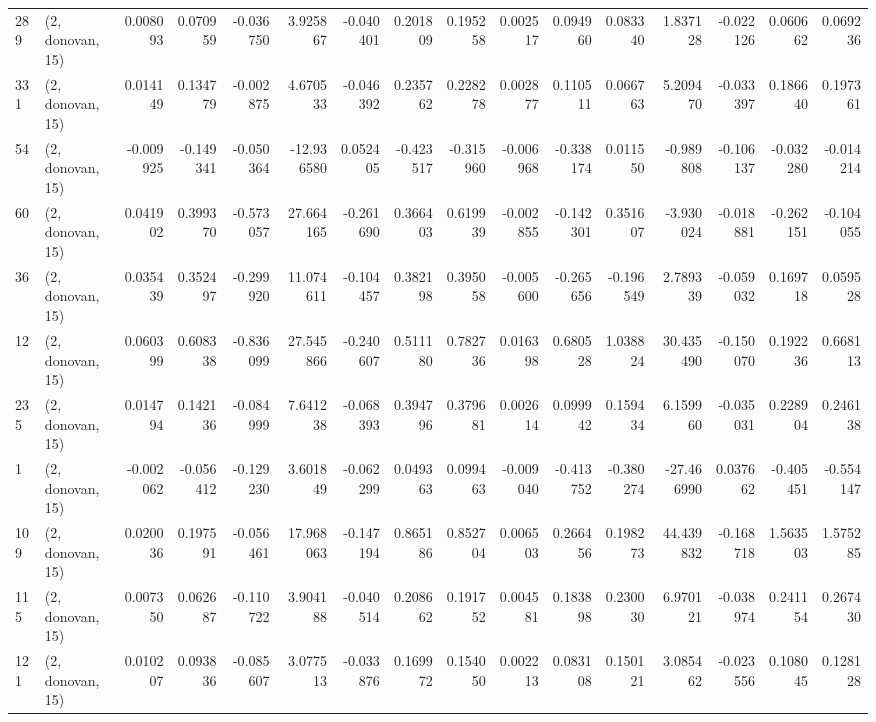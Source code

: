 \begin{tabular}{llrrrrrrrrrrrrrr}
289 &  (2, donovan, 15) &   0.008093 &  0.070959 & -0.036750 &    3.925867 & -0.040401 &   0.201809 &  0.195258 &  0.002517 &  0.094960 &  0.083340 &    1.837128 & -0.022126 &  0.060662 &  0.069236 \\
331 &  (2, donovan, 15) &   0.014149 &  0.134779 & -0.002875 &    4.670533 & -0.046392 &   0.235762 &  0.228278 &  0.002877 &  0.110511 &  0.066763 &    5.209470 & -0.033397 &  0.186640 &  0.197361 \\
54  &  (2, donovan, 15) &  -0.009925 & -0.149341 & -0.050364 &  -12.936580 &  0.052405 &  -0.423517 & -0.315960 & -0.006968 & -0.338174 &  0.011550 &   -0.989808 & -0.106137 & -0.032280 & -0.014214 \\
60  &  (2, donovan, 15) &   0.041902 &  0.399370 & -0.573057 &   27.664165 & -0.261690 &   0.366403 &  0.619939 & -0.002855 & -0.142301 &  0.351607 &   -3.930024 & -0.018881 & -0.262151 & -0.104055 \\
36  &  (2, donovan, 15) &   0.035439 &  0.352497 & -0.299920 &   11.074611 & -0.104457 &   0.382198 &  0.395058 & -0.005600 & -0.265656 & -0.196549 &    2.789339 & -0.059032 &  0.169718 &  0.059528 \\
12  &  (2, donovan, 15) &   0.060399 &  0.608338 & -0.836099 &   27.545866 & -0.240607 &   0.511180 &  0.782736 &  0.016398 &  0.680528 &  1.038824 &   30.435490 & -0.150070 &  0.192236 &  0.668113 \\
235 &  (2, donovan, 15) &   0.014794 &  0.142136 & -0.084999 &    7.641238 & -0.068393 &   0.394796 &  0.379681 &  0.002614 &  0.099942 &  0.159434 &    6.159960 & -0.035031 &  0.228904 &  0.246138 \\
1   &  (2, donovan, 15) &  -0.002062 & -0.056412 & -0.129230 &    3.601849 & -0.062299 &   0.049363 &  0.099463 & -0.009040 & -0.413752 & -0.380274 &  -27.466990 &  0.037662 & -0.405451 & -0.554147 \\
109 &  (2, donovan, 15) &   0.020036 &  0.197591 & -0.056461 &   17.968063 & -0.147194 &   0.865186 &  0.852704 &  0.006503 &  0.266456 &  0.198273 &   44.439832 & -0.168718 &  1.563503 &  1.575285 \\
115 &  (2, donovan, 15) &   0.007350 &  0.062687 & -0.110722 &    3.904188 & -0.040514 &   0.208662 &  0.191752 &  0.004581 &  0.183898 &  0.230030 &    6.970121 & -0.038974 &  0.241154 &  0.267430 \\
121 &  (2, donovan, 15) &   0.010207 &  0.093836 & -0.085607 &    3.077513 & -0.033876 &   0.169972 &  0.154050 &  0.002213 &  0.083108 &  0.150121 &    3.085462 & -0.023556 &  0.108045 &  0.128128 \\

\end{tabular}

